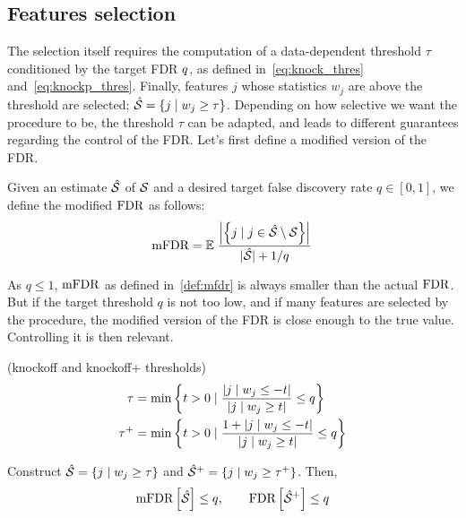 \subsection{Features selection}\label{subsec:kfs}

The selection itself requires the computation of a data-dependent threshold $\tau$
conditioned by the target FDR $q$, as defined in~\ref{eq:knock_thres} and~\ref{eq:knockp_thres}.
Finally, features $j$ whose statistics $w_j$ are above the threshold are selected;
$\hat{\mathcal{S}} = \left\{ j \mid w_j \geq \tau \right\}$.
Depending on how selective we want the procedure to be, the threshold $\tau$ can be adapted,
and leads to different guarantees regarding the control of the FDR\@.
Let's first define a modified version of the FDR\@.
\begin{definition}\label{def:mfdr}
        Given an estimate $\hat{\mathcal{S}}$ of $\mathcal{S}$ and a desired target false discovery rate $q \in [0, 1]$,
        we define the modified $\text{FDR}$ as follows:
        \begin{equation*}
                \text{mFDR} = {\mathbb E}\left.
                \frac
                {\left\lvert\left\{ j \mid j \in \hat{\mathcal{S}} \setminus \mathcal{S} \right\}\right\rvert}
                {\lvert\hat{\mathcal{S}}\rvert + 1 / q}
                \right.
        \end{equation*}
\end{definition}
As $q \leq 1$, $\text{mFDR}$ as defined in~\ref{def:mfdr} is always smaller than the actual $\text{FDR}$.
But if the target threshold $q$ is not too low, and if many features are selected by the procedure,
the modified version of the FDR is close enough to the true value.
Controlling it is then relevant.
\begin{definition}
        (knockoff and knockoff+ thresholds)
        \begin{align}
                \tau &=
                        \min\left\{
                                t > 0 \mid \frac{\left\lvert j \mid w_j \leq -t\right\rvert}{\left\lvert j \mid w_j \geq t\right\rvert} \leq q
                        \right\}\label{eq:knock_thres}\\
                \tau^+ &=
                        \min\left\{
                                t > 0 \mid \frac{1 + \left\lvert j \mid w_j \leq -t\right\rvert}{\left\lvert j \mid w_j \geq t\right\rvert} \leq q
                        \right\}\label{eq:knockp_thres}
        \end{align}
\end{definition}

\begin{theorem}
        Construct $\hat{\mathcal{S}} = \left\{ j \mid w_j \geq \tau \right\}$
        and $\hat{\mathcal{S}}^+ = \left\{ j \mid w_j \geq \tau^+ \right\}$.
        Then,
        \begin{equation}
                \text{mFDR}\left[ \hat{\mathcal{S}} \right] \leq q
                ,\qquad
                \text{FDR}\left[ \hat{\mathcal{S}}^+ \right] \leq q
        \end{equation}
\end{theorem}
%
